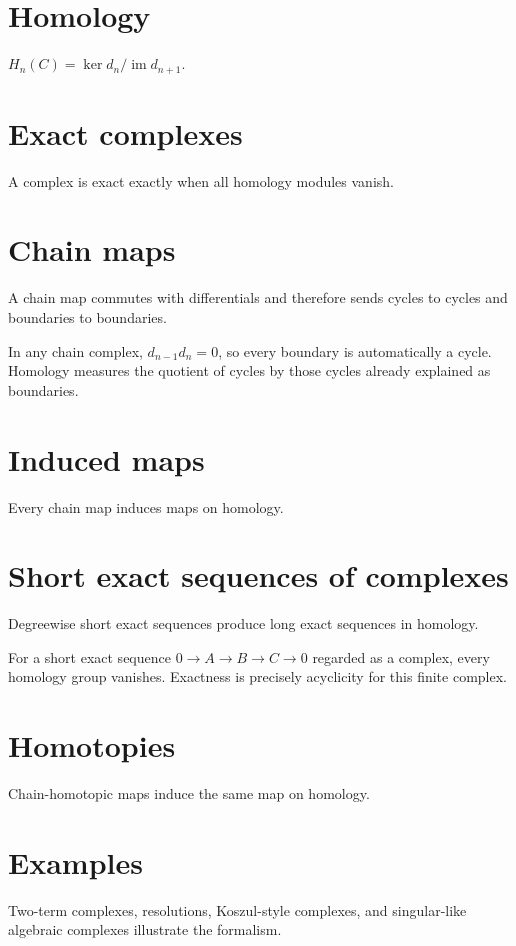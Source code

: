 \section{Homology}
$H_n(C)=\ker d_n/\operatorname{im}d_{n+1}$.

\section{Exact complexes}
A complex is exact exactly when all homology modules vanish.

\section{Chain maps}
A chain map commutes with differentials and therefore sends cycles to cycles and boundaries to boundaries.

\begin{example}\label{ex:v22-expand-02}
In any chain complex, $d_{n-1}d_n=0$, so every boundary is automatically a cycle. Homology measures the quotient of cycles by those cycles already explained as boundaries.
\end{example}
\section{Induced maps}
Every chain map induces maps on homology.

\section{Short exact sequences of complexes}
Degreewise short exact sequences produce long exact sequences in homology.

\begin{example}\label{ex:v22-expand-03}
For a short exact sequence $0\to A\to B\to C\to0$ regarded as a complex, every homology group vanishes. Exactness is precisely acyclicity for this finite complex.
\end{example}
\section{Homotopies}
Chain-homotopic maps induce the same map on homology.

\section{Examples}
Two-term complexes, resolutions, Koszul-style complexes, and singular-like algebraic complexes illustrate the formalism.

